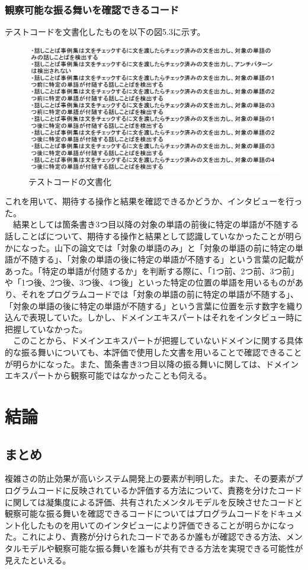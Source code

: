 \documentclass[11pt, a4paper]{jreport}
\begin{document}
\subsection{観察可能な振る舞いを確認できるコード}
テストコードを文書化したものを以下の図5.3に示す。
\begin{figure}[H]
\centering
\includegraphics[width=1\linewidth]{image/hurumai.png}
\caption{テストコードの文書化}
\label{fig:enter-label}
\end{figure}
これを用いて、期待する操作と結果を確認できるかどうか、インタビューを行った。
\\　結果としては箇条書き3つ目以降の対象の単語の前後に特定の単語が不随する話しことばについて、期待する操作と結果として認識していなかったことが明らかになった。山下の論文では「対象の単語のみ」と「対象の単語の前に特定の単語が不随する」、「対象の単語の後に特定の単語が不随する」という言葉の記載があった。「特定の単語が付随するか」を判断する際に、「1つ前、2つ前、3つ前」や「1つ後、2つ後、3つ後、4つ後」といった特定の位置の単語を用いるものがあり、それをプログラムコードでは「対象の単語の前に特定の単語が不随する」、「対象の単語の後に特定の単語が不随する」という言葉に位置を示す数字を織り込んで表現していた。しかし、ドメインエキスパートはそれをインタビュー時に把握していなかった。
\\　このことから、ドメインエキスパートが把握していないドメインに関する具体的な振る舞いについても、本評価で使用した文書を用いることで確認できることが明らかになった。また、箇条書き3つ目以降の振る舞いに関しては、ドメインエキスパートから観察可能ではなかったことも伺える。
\chapter{結論}
\section{まとめ}
複雑さの防止効果が高いシステム開発上の要素が判明した。また、その要素がプログラムコードに反映されているか評価する方法について、責務を分けたコードに関しては凝集度による評価、共有されたメンタルモデルを反映させたコードと観察可能な振る舞いを確認できるコードについてはプログラムコードをドキュメント化したものを用いてのインタビューにより評価できることが明らかになった。これにより、責務が分けられたコードであるか誰もが確認できる方法、メンタルモデルや観察可能な振る舞いを誰もが共有できる方法を実現できる可能性が見えたといえる。
\end{document}
